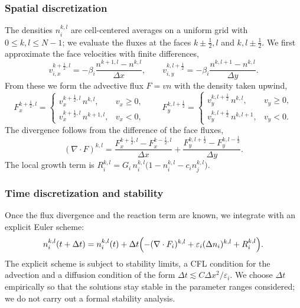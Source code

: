 \documentclass[11pt]{article}
\begin{document}
\subsubsection{Spatial discretization}
The densities $n^{k,l}_i$ are cell-centered averages on a uniform grid with $0 \le
k, l \le N - 1$; we evaluate the fluxes at the faces $k \pm \tfrac{1}{2}, l$ and
$k, l \pm \tfrac{1}{2}$. We first approximate the face velocities with finite
differences,
\begin{equation}
    v^{k + \frac{1}{2}, l}_{i, x} = -\beta_i \frac{n^{k+1, l} - n^{k, l}}{\Delta x},
    \qquad
    v^{k, l + \frac{1}{2}}_{i, y} = -\beta_i \frac{n^{k, l+1} - n^{k, l}}{\Delta y}.
\end{equation}
From these we form the advective flux $F = v n$ with the density taken upwind,
\begin{equation}
    F^{k + \frac{1}{2}, l}_x =
    \begin{cases}
        v^{k + \frac{1}{2}, l}_x\, n^{k, l},   & v_x \ge 0, \\[3pt]
        v^{k + \frac{1}{2}, l}_x\, n^{k+1, l}, & v_x < 0,
    \end{cases}
    \qquad
    F^{k, l + \frac{1}{2}}_y =
    \begin{cases}
        v^{k, l + \frac{1}{2}}_y\, n^{k, l},   & v_y \ge 0, \\[3pt]
        v^{k, l + \frac{1}{2}}_y\, n^{k, l+1}, & v_y < 0.
    \end{cases}
\end{equation}
The divergence follows from the difference of the face fluxes,
\begin{equation}
    (\nabla \cdot F)^{k, l}
    = \frac{F^{k + \frac{1}{2}, l}_x - F^{k - \frac{1}{2}, l}_x}{\Delta x}
    + \frac{F^{k, l + \frac{1}{2}}_y - F^{k, l - \frac{1}{2}}_y}{\Delta y}.
\end{equation}
The local growth term is $R^{k, l}_i = G_i\, n^{k, l}_i \bigl(1 - n^{k, l}_i - c_i
n^{k, l}_j\bigr)$.

\subsubsection{Time discretization and stability}
Once the flux divergence and the reaction term are known, we integrate with an
explicit Euler scheme:
\begin{equation}
    n^{k, l}_i(t + \Delta t) = n^{k, l}_i(t) + \Delta t \Bigl(
    -(\nabla \cdot F_i)^{k, l} + \varepsilon_i (\Delta n_i)^{k, l} + R^{k, l}_i
    \Bigr).
\end{equation}
The explicit scheme is subject to stability limits, a CFL condition for the
advection and a diffusion condition of the form $\Delta t \lesssim C \Delta x^2 /
\varepsilon_i$. We choose $\Delta t$ empirically so that the solutions stay stable
in the parameter ranges considered; we do not carry out a formal stability
analysis.
\end{document}
